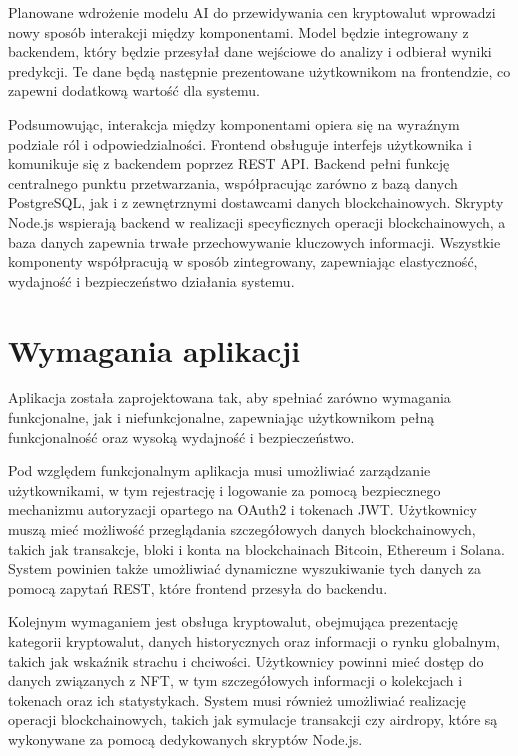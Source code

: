 Planowane wdrożenie modelu AI do przewidywania cen kryptowalut wprowadzi nowy sposób interakcji między komponentami. Model będzie integrowany z backendem, który będzie przesyłał dane wejściowe do analizy i odbierał wyniki predykcji. Te dane będą następnie prezentowane użytkownikom na frontendzie, co zapewni dodatkową wartość dla systemu.

Podsumowując, interakcja między komponentami opiera się na wyraźnym podziale ról i odpowiedzialności. Frontend obsługuje interfejs użytkownika i komunikuje się z backendem poprzez REST API. Backend pełni funkcję centralnego punktu przetwarzania, współpracując zarówno z bazą danych PostgreSQL, jak i z zewnętrznymi dostawcami danych blockchainowych. Skrypty Node.js wspierają backend w realizacji specyficznych operacji blockchainowych, a baza danych zapewnia trwałe przechowywanie kluczowych informacji. Wszystkie komponenty współpracują w sposób zintegrowany, zapewniając elastyczność, wydajność i bezpieczeństwo działania systemu.



\section{Wymagania aplikacji} %

Aplikacja została zaprojektowana tak, aby spełniać zarówno wymagania funkcjonalne, jak i niefunkcjonalne, zapewniając użytkownikom pełną funkcjonalność oraz wysoką wydajność i bezpieczeństwo.

Pod względem funkcjonalnym aplikacja musi umożliwiać zarządzanie użytkownikami, w tym rejestrację i logowanie za pomocą bezpiecznego mechanizmu autoryzacji opartego na OAuth2 i tokenach JWT. Użytkownicy muszą mieć możliwość przeglądania szczegółowych danych blockchainowych, takich jak transakcje, bloki i konta na blockchainach Bitcoin, Ethereum i Solana. System powinien także umożliwiać dynamiczne wyszukiwanie tych danych za pomocą zapytań REST, które frontend przesyła do backendu.

Kolejnym wymaganiem jest obsługa kryptowalut, obejmująca prezentację kategorii kryptowalut, danych historycznych oraz informacji o rynku globalnym, takich jak wskaźnik strachu i chciwości. Użytkownicy powinni mieć dostęp do danych związanych z NFT, w tym szczegółowych informacji o kolekcjach i tokenach oraz ich statystykach. System musi również umożliwiać realizację operacji blockchainowych, takich jak symulacje transakcji czy airdropy, które są wykonywane za pomocą dedykowanych skryptów Node.js.

